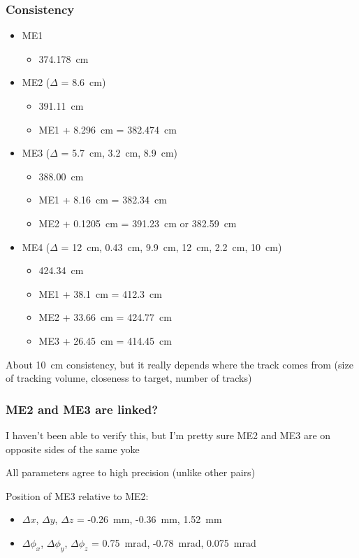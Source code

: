 \documentclass[compress]{beamer}
\begin{document}
\begin{frame}
\frametitle{Consistency}
\small

\begin{itemize}
\item ME1
\begin{itemize}
\item 374.178~cm
\end{itemize}

\item ME2 ($\Delta$ = 8.6~cm)
\begin{itemize}
\item 391.11~cm
\item ME1 + 8.296~cm = 382.474~cm
\end{itemize}

\item ME3 ($\Delta$ = 5.7~cm, 3.2~cm, 8.9~cm)
\begin{itemize}
\item 388.00~cm
\item ME1 + 8.16~cm = 382.34~cm
\item ME2 + 0.1205~cm = 391.23~cm or 382.59~cm
\end{itemize}

\item ME4 ($\Delta$ = 12~cm, 0.43~cm, 9.9~cm, 12~cm, 2.2~cm, 10~cm)
\begin{itemize}
\item 424.34~cm
\item ME1 + 38.1~cm = 412.3~cm
\item ME2 + 33.66~cm = 424.77~cm
\item ME3 + 26.45~cm = 414.45~cm
\end{itemize}
\end{itemize}

\vfill About 10~cm consistency, but it really depends where the track
comes from (size of tracking volume, closeness to target, number of
tracks)

\end{frame}

\begin{frame}
\frametitle{ME2 and ME3 are linked?}

I haven't been able to verify this, but I'm pretty sure ME2 and ME3 are on opposite sides of the same yoke

\vfill All parameters agree to high precision (unlike other pairs)

\vfill Position of ME3 relative to ME2:

\begin{itemize}
\item $\Delta x$, $\Delta y$, $\Delta z$ = -0.26~mm, -0.36~mm, 1.52~mm
\item $\Delta \phi_x$, $\Delta \phi_y$, $\Delta \phi_z$ = 0.75~mrad, -0.78~mrad, 0.075~mrad
\end{itemize}

\end{frame}
\end{document}

